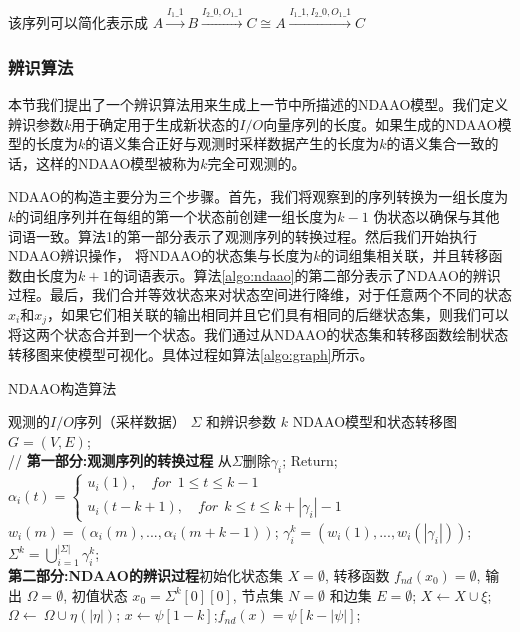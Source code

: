 该序列可以简化表示成 $A\xrightarrow{I_1\_1}B\xrightarrow{I_2\_0,O_1\_1}C\cong A\xrightarrow{I_1\_1,I_2\_0,O_1\_1}C$

\subsubsection{辨识算法}

本节我们提出了一个辨识算法用来生成上一节中所描述的NDAAO模型。我们定义辨识参数$ k $用于确定用于生成新状态的$I/O$向量序列的长度。如果生成的NDAAO模型的长度为$ k $的语义集合正好与观测时采样数据产生的长度为$k$的语义集合一致的话，这样的NDAAO模型被称为$ k $完全可观测的。

NDAAO的构造主要分为三个步骤。首先，我们将观察到的序列转换为一组长度为$ k $的词组序列并在每组的第一个状态前创建一组长度为$ k-1 $ 伪状态以确保与其他词语一致。算法1的第一部分表示了观测序列的转换过程。然后我们开始执行NDAAO辨识操作， 将NDAAO的状态集与长度为$ k $的词组集相关联，并且转移函数由长度为$ k+1 $的词语表示。算法\ref{algo:ndaao}的第二部分表示了NDAAO的辨识过程​​。最后，我们合并等效状态来对状态空间进行降维，对于任意两个不同的状态$ x_i $和$ x_j $，如果它们相关联的输出相同并且它们具有相同的后继状态集，则我们可以将这两个状态合并到一个状态。我们通过从NDAAO的状态集和转移函数绘制状态转移图来使模型可视化。具体过程如算法\ref{algo:graph}所示。

\begin{algorithm}[h]
  \caption{NDAAO构造算法}
  \label{algo:ndaao}
  \begin{algorithmic}[1]
    \Require %
    观测的$I/O$序列（采样数据） $\varSigma$ 和辨识参数 $k$
    \Ensure %
    NDAAO模型和状态转移图 $G=(V,E)$;  \\
    // \textbf{第一部分:观测序列的转换过程}
          \State  从$\varSigma$删除$\gamma_i$; Return;\
        \Else
        \State $\alpha_i(t)=\begin{cases}
        u_i(1),\quad for ~~ 1\leq t\leq k-1\\
        u_i(t-k+1),\quad for ~~ k \leq t \leq k+|\gamma_i|-1
        \end{cases}$\
        \State $w_i(m)=(\alpha_i(m),...,\alpha_i(m+k-1))$;
        \EndFor
        \State $\gamma_i^k=(w_i(1),...,w_i(|\gamma_i|))$;
        \EndIf
    \EndFor
    \State $\varSigma^k=\bigcup\limits_{i=1}^{|\varSigma|}  \gamma_i^k$;\\
    \State \textbf{第二部分:NDAAO的辨识过程​​}初始化状态集 $X=\emptyset$, 转移函数 $f_{nd}(x_0)=\emptyset$, 输出 $\Omega=\emptyset$, 初值状态 $x_0=\varSigma^k[0][0]$, 节点集 $N=\emptyset$ 和边集 $E=\emptyset$;
    \ForAll {$\xi$ such that $\xi \in \varSigma^k$} 
      \ForAll {$\eta$ such that $\eta \in \xi$}
      \State $X\leftarrow X\cup \xi$; $\Omega \leftarrow\ \Omega \cup \eta(|\eta|)$;
      \EndFor
    \EndFor
      \State $x \leftarrow \psi[1-k]$;$f_{nd}(x)=\psi[k-|\psi|]$;  
      \EndFor
    \EndFor
  \end{algorithmic}
\end{algorithm}


